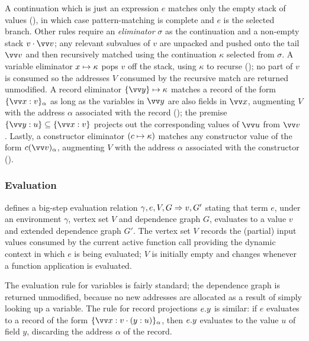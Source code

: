 A continuation which is just an expression $e$ matches only the empty stack of values
(), in which case pattern-matching is complete and $e$ is the selected branch. Other rules require an \emph{eliminator} $\sigma$ as the continuation and a non-empty stack $v \cons \seq{v}$;
any relevant subvalues of $v$ are unpacked and pushed onto the tail $\seq{v}$ and then recursively matched
using the continuation $\kappa$ selected from $\sigma$. A variable eliminator ${x}\mapsto{\kappa}$ pops $v$
off the stack, using $\kappa$ to recurse (); no part of $v$ is consumed so the
addresses $V$ consumed by the recursive match are returned unmodified. A record eliminator
$\elimRecord{\seq{y}}{\kappa}$ matches a record of the form $\annot{\exRec{\seq{\bind{x}{v}}}}{\alpha}$ as
long as the variables in $\seq{y}$ are also fields in $\seq{x}$, augmenting $V$ with the address $\alpha$
associated with the record (); the premise $\exRec{\seq{\bind{y}{u}}} \subseteq
\exRec{\seq{\bind{x}{v}}}$ projects out the corresponding values of $\seq{u}$ from $\seq{v}$. Lastly, a
constructor eliminator $({c}\mapsto{\kappa})$ matches any constructor value of the form
$\annot{\exConstr{c}{\seq{v}}}{\alpha}$, augmenting $V$ with the address $\alpha$ associated with the
constructor ().

\subsubsection{Evaluation}

 defines a big-step evaluation relation $\gamma, e, V, G \Rightarrow v, G'$ stating that term
$e$, under an environment $\gamma$, vertex set $V$ and dependence graph $G$, evaluates to a value $v$ and
extended dependence graph $G'$. The vertex set $V$ records the (partial) input values consumed by the current
active function call providing the dynamic context in which $e$ is being evaluated; $V$ is initially empty and
changes whenever a function application is evaluated.

The evaluation rule for variables is fairly standard; the dependence graph is returned unmodified, because no
new addresses are allocated as a result of simply looking up a variable. The rule for record projections
$e.y$ is similar: if $e$ evaluates to a record of the form $\annRec{\seq{\bind{x}{v}} \cons
(\bind{y}{u})}{\alpha}$, then $e.y$ evaluates to the value $u$ of field $y$, discarding the
address $\alpha$ of the record.

